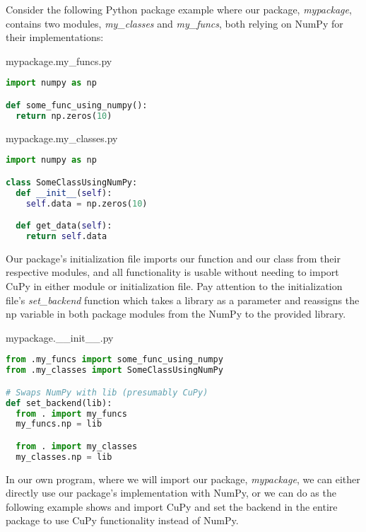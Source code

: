 Consider the following Python package example where our package, \textit{mypackage}, contains two modules, \textit{my\_classes} and \textit{my\_funcs}, both relying on NumPy for their implementations:

\begin{center}
mypackage.my\_funcs.py
\end{center}
\begin{lstlisting}[language=Python,style=pycode]
import numpy as np

def some_func_using_numpy():
  return np.zeros(10)
\end{lstlisting}

\begin{center}
mypackage.my\_classes.py
\end{center}
\begin{lstlisting}[language=Python,style=pycode]
import numpy as np

class SomeClassUsingNumPy:
  def __init__(self):
    self.data = np.zeros(10)

  def get_data(self):
    return self.data
\end{lstlisting}

Our package's initialization file imports our function and our class from their respective modules, and all functionality is usable without needing to import CuPy in either module or initialization file.
Pay attention to the initialization file's \textit{set\_backend} function which takes a library as a parameter and reassigns the np variable in both package modules from the NumPy to the provided library.

\begin{center}
mypackage.\_\_init\_\_.py
\end{center}
\begin{lstlisting}[language=Python,style=pycode]
from .my_funcs import some_func_using_numpy
from .my_classes import SomeClassUsingNumPy 

# Swaps NumPy with lib (presumably CuPy)
def set_backend(lib):
  from . import my_funcs
  my_funcs.np = lib

  from . import my_classes
  my_classes.np = lib
\end{lstlisting}

In our own program, where we will import our package, \textit{mypackage}, we can either directly use our package's implementation with NumPy, or we can do as the following example shows and import CuPy and set the backend in the entire package to use CuPy functionality instead of NumPy.

